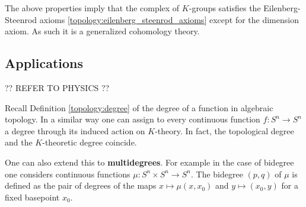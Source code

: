 {    \begin{remark}
        The above properties imply that the complex of $K$-groups satisfies the Eilenberg-Steenrod axioms \ref{topology:eilenberg_steenrod_axioms} except for the dimension axiom. As such it is a generalized cohomology theory.
    \end{remark}

\subsection{Applications}

    ?? REFER TO PHYSICS ??

    \begin{property}[Degree]
        Recall Definition \ref{topology:degree} of the degree of a function in algebraic topology. In a similar way one can assign to every continuous function $f:S^n\rightarrow S^n$ a degree through its induced action on $K$-theory. In fact, the topological degree and the $K$-theoretic degree coincide.

        One can also extend this to \textbf{multidegrees}. For example in the case of bidegree one considers continuous functions $\mu:S^n\times S^n\rightarrow S^n$. The bidegree $(p,q)$ of $\mu$ is defined as the pair of degrees of the maps $x\mapsto\mu(x,x_0)$ and $y\mapsto(x_0,y)$ for a fixed basepoint $x_0$.
    \end{property}


}
